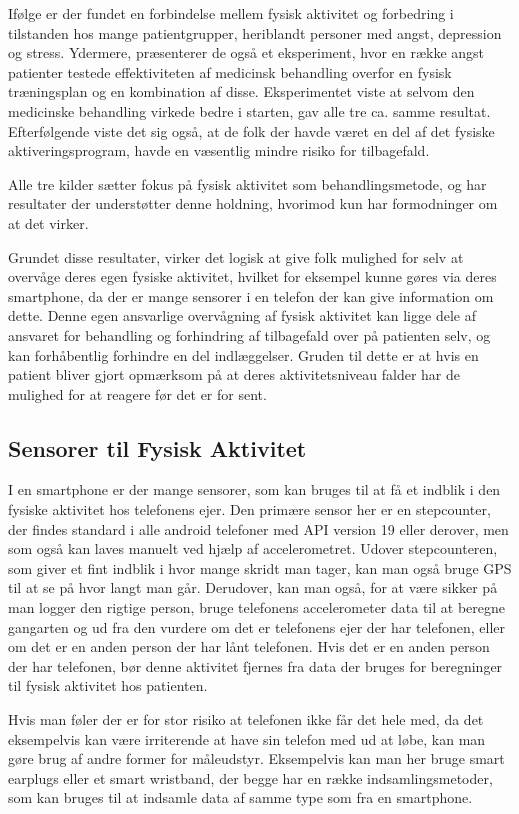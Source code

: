 Ifølge \citet{book:sportPsyc} er der fundet en forbindelse mellem fysisk aktivitet og forbedring i tilstanden hos mange patientgrupper, heriblandt personer med angst, depression og stress.
Ydermere, præsenterer de også et eksperiment, hvor en række angst patienter testede effektiviteten af medicinsk behandling overfor en fysisk træningsplan og en kombination af disse.
Eksperimentet viste at selvom den medicinske behandling virkede bedre i starten, gav alle tre ca. samme resultat.
Efterfølgende viste det sig også, at de folk der havde været en del af det fysiske aktiveringsprogram, havde en væsentlig mindre risiko for tilbagefald.

Alle tre kilder sætter fokus på fysisk aktivitet som behandlingsmetode, \citet{art:physMental} og \citet{book:sportPsyc} har resultater der understøtter denne holdning, hvorimod \citet{misc:healthReports} kun har formodninger om at det virker.

Grundet disse resultater, virker det logisk at give folk mulighed for selv at overvåge deres egen fysiske aktivitet, hvilket for eksempel kunne gøres via deres smartphone, da der er mange sensorer i en telefon der kan give information om dette.
Denne egen ansvarlige overvågning af fysisk aktivitet kan ligge dele af ansvaret for behandling og forhindring af tilbagefald over på patienten selv, og kan forhåbentlig forhindre en del indlæggelser.
Gruden til dette er at hvis en patient bliver gjort opmærksom på at deres aktivitetsniveau falder har de mulighed for at reagere før det er for sent.

\subsection{Sensorer til Fysisk Aktivitet}
I en smartphone er der mange sensorer, som kan bruges til at få et indblik i den fysiske aktivitet hos telefonens ejer.
Den primære sensor her er en stepcounter, der findes standard i alle android telefoner med API version 19 eller derover, men som også kan laves manuelt ved hjælp af accelerometret.
Udover stepcounteren, som giver et fint indblik i hvor mange skridt man tager, kan man også bruge GPS til at se på hvor langt man går.
Derudover, kan man også, for at være sikker på man logger den rigtige person, bruge telefonens accelerometer data til at beregne gangarten \citep{4272626} og ud fra den vurdere om det er telefonens ejer der har telefonen, eller om det er en anden person der har lånt telefonen.
Hvis det er en anden person der har telefonen, bør denne aktivitet fjernes fra data der bruges for beregninger til fysisk aktivitet hos patienten.

Hvis man føler der er for stor risiko at telefonen ikke får det hele med, da det eksempelvis kan være irriterende at have sin telefon med ud at løbe, kan man gøre brug af andre former for måleudstyr.
Eksempelvis kan man her bruge smart earplugs eller et smart wristband, der begge har en række indsamlingsmetoder, som kan bruges til at indsamle data af samme type som fra en smartphone.